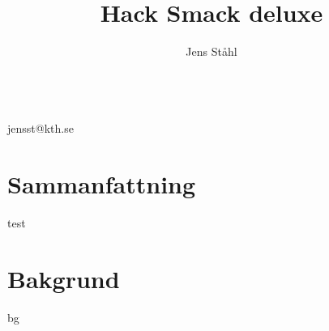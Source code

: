 \documentclass[a4paper]{article}
\author{Jens Ståhl}
\title{Hack Smack deluxe}
\begin{document}
\maketitle
\ \\
jensst@kth.se\\

\section*{Sammanfattning}
test
\newpage
\tableofcontents
\newpage
\section{Bakgrund}
bg
\end{document}
